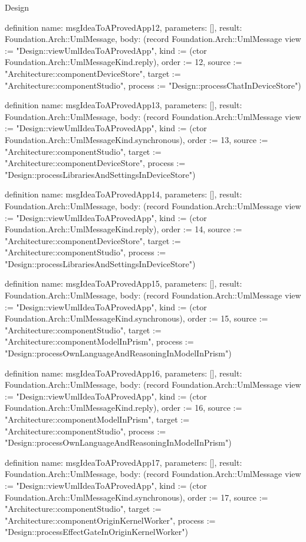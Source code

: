\begin{lexlean}{Design}
\begin{semanticmodule}
definition{
  name: msgIdeaToAProvedApp12,
  parameters: [],
  result: Foundation.Arch::UmlMessage,
  body: (record Foundation.Arch::UmlMessage {view := "Design::viewUmlIdeaToAProvedApp", kind := (ctor Foundation.Arch::UmlMessageKind.reply), order := 12, source := "Architecture::componentDeviceStore", target := "Architecture::componentStudio", process := "Design::processChatInDeviceStore"})
}

definition{
  name: msgIdeaToAProvedApp13,
  parameters: [],
  result: Foundation.Arch::UmlMessage,
  body: (record Foundation.Arch::UmlMessage {view := "Design::viewUmlIdeaToAProvedApp", kind := (ctor Foundation.Arch::UmlMessageKind.synchronous), order := 13, source := "Architecture::componentStudio", target := "Architecture::componentDeviceStore", process := "Design::processLibrariesAndSettingsInDeviceStore"})
}

definition{
  name: msgIdeaToAProvedApp14,
  parameters: [],
  result: Foundation.Arch::UmlMessage,
  body: (record Foundation.Arch::UmlMessage {view := "Design::viewUmlIdeaToAProvedApp", kind := (ctor Foundation.Arch::UmlMessageKind.reply), order := 14, source := "Architecture::componentDeviceStore", target := "Architecture::componentStudio", process := "Design::processLibrariesAndSettingsInDeviceStore"})
}

definition{
  name: msgIdeaToAProvedApp15,
  parameters: [],
  result: Foundation.Arch::UmlMessage,
  body: (record Foundation.Arch::UmlMessage {view := "Design::viewUmlIdeaToAProvedApp", kind := (ctor Foundation.Arch::UmlMessageKind.synchronous), order := 15, source := "Architecture::componentStudio", target := "Architecture::componentModelInPrism", process := "Design::processOwnLanguageAndReasoningInModelInPrism"})
}

definition{
  name: msgIdeaToAProvedApp16,
  parameters: [],
  result: Foundation.Arch::UmlMessage,
  body: (record Foundation.Arch::UmlMessage {view := "Design::viewUmlIdeaToAProvedApp", kind := (ctor Foundation.Arch::UmlMessageKind.reply), order := 16, source := "Architecture::componentModelInPrism", target := "Architecture::componentStudio", process := "Design::processOwnLanguageAndReasoningInModelInPrism"})
}

definition{
  name: msgIdeaToAProvedApp17,
  parameters: [],
  result: Foundation.Arch::UmlMessage,
  body: (record Foundation.Arch::UmlMessage {view := "Design::viewUmlIdeaToAProvedApp", kind := (ctor Foundation.Arch::UmlMessageKind.synchronous), order := 17, source := "Architecture::componentStudio", target := "Architecture::componentOriginKernelWorker", process := "Design::processEffectGateInOriginKernelWorker"})
}


\end{semanticmodule}
\end{lexlean}
